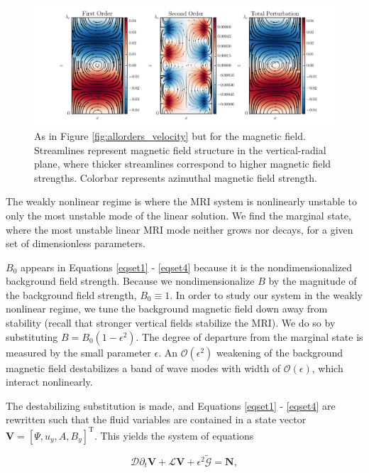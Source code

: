 \documentclass{emulateapj}
\newcommand{\beq}{\begin{equation}}
\newcommand{\eeq}{\end{equation}}
\begin{document}
\begin{figure}
\centering
\includegraphics[width=\textwidth]{../figures/thingap_streamfuncs_Bfield_Pm_1E-3.png}
\caption{As in Figure \ref{fig:allorders_velocity} but for the magnetic field. Streamlines represent magnetic field structure in the vertical-radial plane, where thicker streamlines correspond to higher magnetic field strengths. Colorbar represents azimuthal magnetic field strength.}\label{fig:allorders_Bfield}
\end{figure}

The weakly nonlinear regime is where the MRI system is nonlinearly unstable to only the most unstable mode of the linear solution. We find the marginal state, where the most unstable linear MRI mode neither grows nor decays, for a given set of dimensionless parameters. 

$B_0$ appears in Equations \ref{eqset1} - \ref{eqset4} because it is the nondimensionalized background field strength. Because we nondimensionalize $B$ by the magnitude of the background field strength, $B_0 \equiv 1$. In order to study our system in the weakly nonlinear regime, we tune the background magnetic field down away from stability (recall that stronger vertical fields stabilize the MRI). We do so by substituting $B = B_0\left(1 - \epsilon^2\right)$. The degree of departure from the marginal state is measured by the small parameter $\epsilon$. An $\mathcal{O}\left(\epsilon^2\right)$ weakening of the background magnetic field destabilizes a band of wave modes with width of $\mathcal{O}\left(\epsilon\right)$, which interact nonlinearly.

The destabilizing substitution is made, and Equations \ref{eqset1} - \ref{eqset4} are rewritten such that the fluid variables are contained in a state vector $\mathbf{V} = \left[\Psi, u_y, A, B_y\right]^\mathrm{T}$. This yields the system of equations

\beq
\label{eq:unperturbed_matrix_equations}
 \mathcal{D}\partial_t \mathbf{V} +  \mathcal{L} \mathbf{V} + \epsilon^2\widetilde{\mathcal{G}} = \mathbf{N},
\eeq
\end{document}
